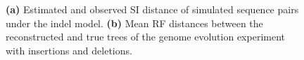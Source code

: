 \documentclass[9pt,english,utf8]{article}
\begin{document}
\begin{figure}[h]
   



    \caption{\textbf{(a)} Estimated and observed SI distance of simulated
    sequence pairs under the indel model. \textbf{(b)} Mean RF distances
    between the reconstructed and true trees of the genome evolution experiment
    with insertions and deletions.} \label{fig:results_indel}
\end{figure}
\end{document}
